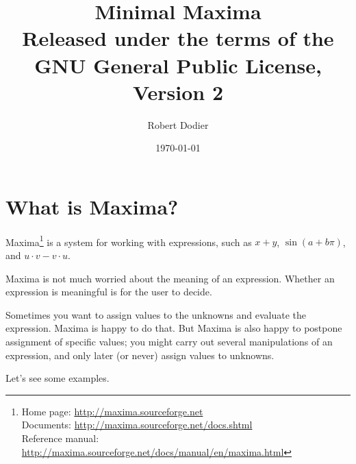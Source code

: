 \documentclass[12pt]{article}
\title{Minimal Maxima\\
{\small Released under the terms of the GNU General Public License, Version 2}}
\author{Robert Dodier}
\date{\today}
\begin{document}
\maketitle

\section{What is Maxima?}

Maxima\footnote
{Home page: \url{http://maxima.sourceforge.net} \\
Documents: \url{http://maxima.sourceforge.net/docs.shtml} \\
Reference manual: \url{http://maxima.sourceforge.net/docs/manual/en/maxima.html}}
is a system for working with expressions,
such as $x + y$, $\sin (a + b \pi)$, and $u \cdot v - v \cdot u$.

Maxima is not much worried about the meaning of an expression.
Whether an expression is meaningful is for the user to decide.

Sometimes you want to assign values to the unknowns 
and evaluate the expression.
Maxima is happy to do that.
But Maxima is also happy to postpone assignment of specific values;
you might carry out several manipulations of an expression,
and only later (or never) assign values to unknowns.

Let's see some examples.
\end{document}
